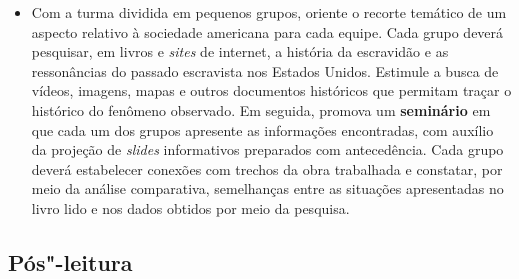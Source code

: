 \documentclass[12pt]{extarticle}
\begin{document}
\begin{itemize}
\item
  Com a turma dividida em pequenos grupos, oriente o recorte temático de
  um aspecto relativo à sociedade americana para cada equipe. Cada grupo
  deverá pesquisar, em livros e \emph{sites} de internet, a história da
  escravidão e as ressonâncias do passado escravista nos Estados Unidos.
  Estimule a busca de vídeos, imagens, mapas e outros documentos
  históricos que permitam traçar o histórico do fenômeno observado. Em
  seguida, promova um \textbf{seminário} em que cada um dos grupos
  apresente as informações encontradas, com auxílio da projeção de
  \emph{slides} informativos preparados com antecedência. Cada grupo
  deverá estabelecer conexões com trechos da obra trabalhada e
  constatar, por meio da análise comparativa, semelhanças entre as
  situações apresentadas no livro lido e nos dados obtidos por meio da
  pesquisa.
\end{itemize}

\subsection{Pós"-leitura}

\end{document}

